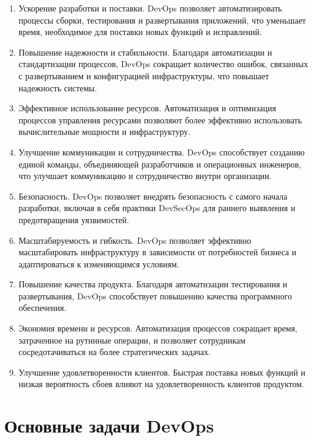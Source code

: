\documentclass[referat]{SCWorks}
\begin{document}
\begin{enumerate}
	\item Ускорение разработки и поставки. DevOps позволяет автоматизировать процессы сборки, тестирования и развертывания приложений, что уменьшает время, необходимое для поставки новых функций и исправлений.

	\item Повышение надежности и стабильности. Благодаря автоматизации и стандартизации процессов, DevOps сокращает количество ошибок, связанных с развертыванием и конфигурацией инфраструктуры, что повышает надежность системы.

	\item Эффективное использование ресурсов. Автоматизация и оптимизация процессов управления ресурсами позволяют более эффективно использовать вычислительные мощности и инфраструктуру.

	\item Улучшение коммуникации и сотрудничества. DevOps способствует созданию единой команды, объединяющей разработчиков и операционных инженеров, что улучшает коммуникацию и сотрудничество внутри организации.

	\item Безопасность. DevOps позволяет внедрять безопасность с самого начала разработки, включая в себя практики DevSecOps для раннего выявления и предотвращения уязвимостей.

	\item Масштабируемость и гибкость. DevOps позволяет эффективно масштабировать инфраструктуру в зависимости от потребностей бизнеса и адаптироваться к изменяющимся условиям.
	
	\item Повышение качества продукта. Благодаря автоматизации тестирования и развертывания, DevOps способствует повышению качества программного обеспечения.
	
	\item Экономия времени и ресурсов. Автоматизация процессов сокращает время, затраченное на рутинные операции, и позволяет сотрудникам сосредотачиваться на более стратегических задачах.
	
	\item Улучшение удовлетворенности клиентов. Быстрая поставка новых функций и низкая вероятность сбоев влияют на удовлетворенность клиентов продуктом.
\end{enumerate}

\section{Основные задачи DevOps}
\end{document}
